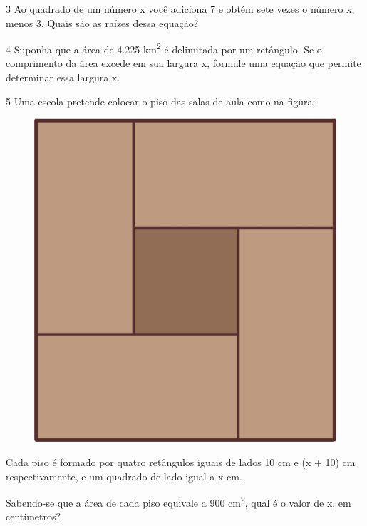 \num{3} Ao quadrado de um número x você adiciona 7 e obtém sete vezes o
número x, menos 3. Quais são as raízes dessa equação?

\begin{emptybox}
\end{emptybox}

\num{4} Suponha que a área de 4.225 km\textsuperscript{2} é delimitada por um
retângulo. Se o comprimento da área excede em sua largura x, formule uma 
equação que permite determinar essa largura x.

\begin{emptybox}
\end{emptybox}

\pagebreak
\num{5} Uma escola pretende colocar o piso das salas de aula como na
figura:

\begin{figure}[htpb!]
\centering
\includegraphics[width=.5\textwidth]{./ilustras-mat/modulo_7-atividade_5.png}
\end{figure}

Cada piso é formado por quatro retângulos iguais de lados 10 cm e (x +
10) cm respectivamente, e um quadrado de lado igual a x cm.

Sabendo-se que a área de cada piso equivale a 900 cm\textsuperscript{2},
qual é o valor de x, em centímetros?

\begin{emptybox}
\end{emptybox}

